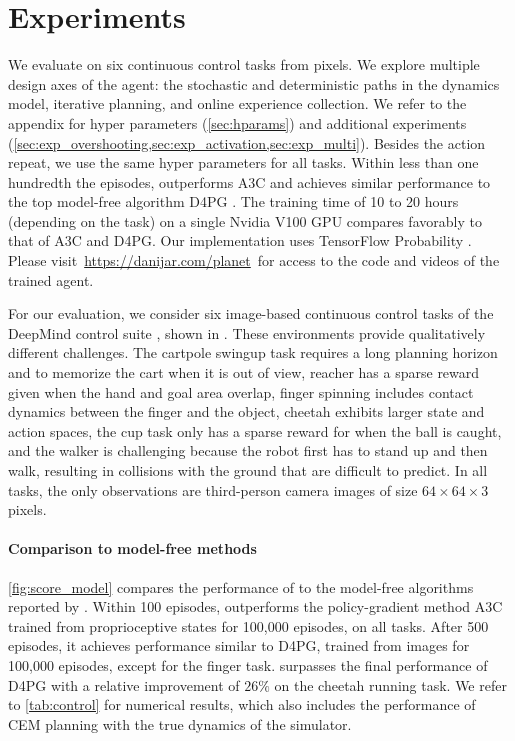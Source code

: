 \section{Experiments}
\label{sec:control}





We evaluate \method on six continuous control tasks from pixels. We explore multiple design axes of the agent: the stochastic and deterministic paths in the dynamics model, iterative planning, and online experience collection. We refer to the appendix for hyper parameters (\cref{sec:hparams}) and additional experiments (\cref{sec:exp_overshooting,sec:exp_activation,sec:exp_multi}). Besides the action repeat, we use the same hyper parameters for all tasks. Within less than one hundredth the episodes, \method outperforms A3C \citep{mnih2016a3c} and achieves similar performance to the top model-free algorithm D4PG \citep{barth2018d4pg}. The training time of 10 to 20 hours (depending on the task) on a single Nvidia V100 GPU compares favorably to that of A3C and D4PG. Our implementation uses TensorFlow Probability \citep{dillon2017tfd}. Please visit \,\url{https://danijar.com/planet}\, for access to the code and videos of the trained agent.

For our evaluation, we consider six image-based continuous control tasks of the DeepMind control suite \citep{tassa2018dmcontrol}, shown in . These environments provide qualitatively different challenges. The cartpole swingup task requires a long planning horizon and to memorize the cart when it is out of view, reacher has a sparse reward given when the hand and goal area overlap, finger spinning includes contact dynamics between the finger and the object, cheetah exhibits larger state and action spaces, the cup task only has a sparse reward for when the ball is caught, and the walker is challenging because the robot first has to stand up and then walk, resulting in collisions with the ground that are difficult to predict. In all tasks, the only observations are third-person camera images of size $64\times 64\times 3$ pixels.

\paragraph{Comparison to model-free methods}

\cref{fig:score_model} compares the performance of \method to the model-free algorithms reported by \citet{tassa2018dmcontrol}. Within 100 episodes, \method outperforms the policy-gradient method A3C trained from proprioceptive states for 100,000 episodes, on all tasks. After 500 episodes, it achieves performance similar to D4PG, trained from images for 100,000 episodes, except for the finger task. \method surpasses the final performance of D4PG with a relative improvement of $26\%$ on the cheetah running task. We refer to \cref{tab:control} for numerical results, which also includes the performance of CEM planning with the true dynamics of the simulator.

